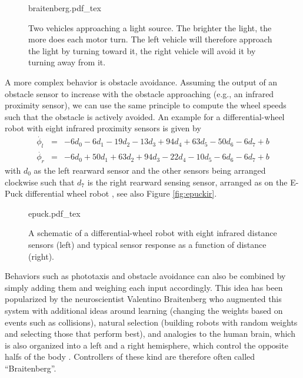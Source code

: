 \begin{figure}
    \centering
    \def\svgwidth{0.7\textwidth}
    {braitenberg.pdf_tex}
    \caption{Two vehicles approaching a light source. The brighter the light, the more does each motor turn. The left vehicle will therefore approach the light by turning toward it, the right vehicle will avoid it by turning away from it.\label{fig:braitenberg}}
\end{figure}

A more complex behavior is obstacle avoidance. Assuming the output of an obstacle sensor to increase with the obstacle approaching (e.g., an infrared proximity sensor), we can use the same principle to compute the wheel speeds such that the obstacle is actively avoided. An example for a differential-wheel robot with eight infrared proximity sensors is given by
\begin{eqnarray}
\nonumber
\dot{\phi_l}&=&-6d_0-6d_1-19d_2-13d_3+94d_4+63d_5-50d_6-6d_7+b\\
\nonumber
\dot{\phi_r}&=&-6d_0+50d_1+63d_2+94d_3-22d_4-10d_5-6d_6-6d_7+b
\end{eqnarray}
%
%
with $d_0$ as the left rearward sensor and the other sensors being arranged clockwise such that $d_7$ is the right rearward sensing sensor, arranged as on the E-Puck differential wheel robot \cite{mondada2009puck}, see also Figure \ref{fig:epuckir}.

\begin{figure}
\centering
    \def\svgwidth{\textwidth}
    {epuck.pdf_tex}
    \caption{A schematic of a differential-wheel robot with eight infrared distance sensors (left) and typical sensor response as a function of distance (right).}
\end{figure}

Behaviors such as phototaxis and obstacle avoidance can also be combined by simply adding them and weighing each input accordingly. This idea has been popularized by the neuroscientist Valentino Braitenberg who augmented this system with additional ideas around learning (changing the weights based on events such as collisions), natural selection (building robots with random weights and selecting those that perform best), and analogies to the human brain, which is also organized into a left and a right hemisphere, which control the opposite halfs of the body \cite{braitenberg1986vehicles}. Controllers of these kind are therefore often called ``Braitenberg''.


